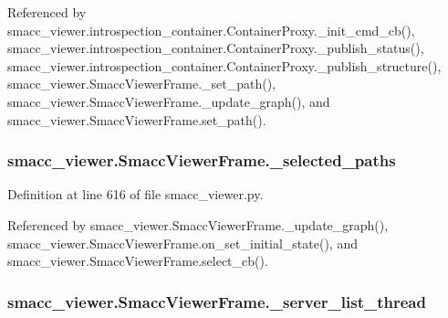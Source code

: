 Referenced by smacc\+\_\+viewer.\+introspection\+\_\+container.\+Container\+Proxy.\+\_\+init\+\_\+cmd\+\_\+cb(), smacc\+\_\+viewer.\+introspection\+\_\+container.\+Container\+Proxy.\+\_\+publish\+\_\+status(), smacc\+\_\+viewer.\+introspection\+\_\+container.\+Container\+Proxy.\+\_\+publish\+\_\+structure(), smacc\+\_\+viewer.\+Smacc\+Viewer\+Frame.\+\_\+set\+\_\+path(), smacc\+\_\+viewer.\+Smacc\+Viewer\+Frame.\+\_\+update\+\_\+graph(), and smacc\+\_\+viewer.\+Smacc\+Viewer\+Frame.\+set\+\_\+path().

\subsubsection[{\texorpdfstring{\+\_\+selected\+\_\+paths}{_selected_paths}}]{\setlength{\rightskip}{0pt plus 5cm}smacc\+\_\+viewer.\+Smacc\+Viewer\+Frame.\+\_\+selected\+\_\+paths\hspace{0.3cm}{\ttfamily [private]}}\hypertarget{classsmacc__viewer_1_1SmaccViewerFrame_abf24da63695ba6bd9aae3dff6e3c5aa7}{}\label{classsmacc__viewer_1_1SmaccViewerFrame_abf24da63695ba6bd9aae3dff6e3c5aa7}


Definition at line 616 of file smacc\+\_\+viewer.\+py.



Referenced by smacc\+\_\+viewer.\+Smacc\+Viewer\+Frame.\+\_\+update\+\_\+graph(), smacc\+\_\+viewer.\+Smacc\+Viewer\+Frame.\+on\+\_\+set\+\_\+initial\+\_\+state(), and smacc\+\_\+viewer.\+Smacc\+Viewer\+Frame.\+select\+\_\+cb().

\subsubsection[{\texorpdfstring{\+\_\+server\+\_\+list\+\_\+thread}{_server_list_thread}}]{\setlength{\rightskip}{0pt plus 5cm}smacc\+\_\+viewer.\+Smacc\+Viewer\+Frame.\+\_\+server\+\_\+list\+\_\+thread\hspace{0.3cm}{\ttfamily [private]}}\hypertarget{classsmacc__viewer_1_1SmaccViewerFrame_a255944c71b59ae95f08135ee1df23566}{}\label{classsmacc__viewer_1_1SmaccViewerFrame_a255944c71b59ae95f08135ee1df23566}


